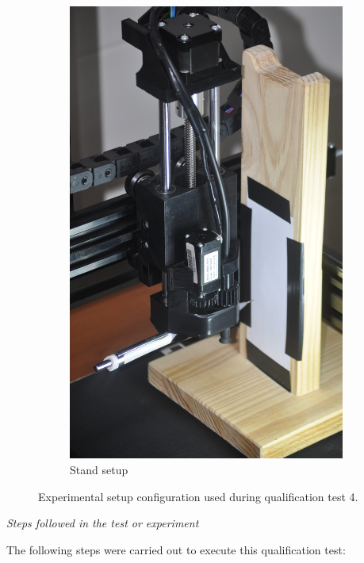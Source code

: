\begin{figure}[!ht]
\begin{subfigure}{.21\textwidth}
		\includegraphics[width=0.95\linewidth]{figures/qualification-test-z-repeat-stand.jpg}
		\caption{Stand setup}
		\label{fig:qtp4-z-axis-test-structure}
	\end{subfigure}
	\caption{Experimental setup configuration used during qualification test 4.}
	\label{fig:qtp4-linear-repeatability-setup}
\end{figure}

\textit{Steps followed in the test or experiment}

The following steps were carried out to execute this qualification test:

